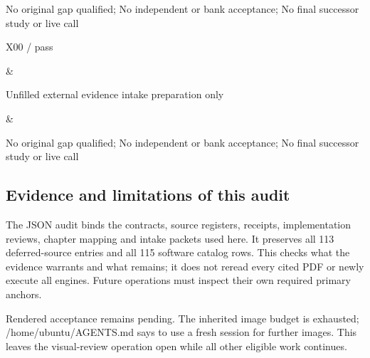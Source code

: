 \documentclass[
  10pt,
]{article}
\begin{document}
\begin{longtable}[]
\begin{minipage}[t]{\linewidth}
No original gap qualified; No independent or bank acceptance; No final
successor study or live call\strut
\end{minipage}\tabularnewline
\begin{minipage}[t]{\linewidth}\raggedright
X00 / pass\strut
\end{minipage} & \begin{minipage}[t]{\linewidth}\raggedright
Unfilled external evidence intake preparation only\strut
\end{minipage} & \begin{minipage}[t]{\linewidth}\raggedright
No original gap qualified; No independent or bank acceptance; No final
successor study or live call\strut
\end{minipage}\tabularnewline
\bottomrule
\end{longtable}

\hypertarget{evidence-and-limitations-of-this-audit}{%
\subsection{Evidence and limitations of this
audit}\label{evidence-and-limitations-of-this-audit}}

The JSON audit binds the contracts, source registers, receipts,
implementation reviews, chapter mapping and intake packets used here. It
preserves all 113 deferred-source entries and all 115 software catalog
rows. This checks what the evidence warrants and what remains; it does
not reread every cited PDF or newly execute all engines. Future
operations must inspect their own required primary anchors.

Rendered acceptance remains pending. The inherited image budget is
exhausted; /home/ubuntu/AGENTS.md says to use a fresh session for
further images. This leaves the visual-review operation open while all
other eligible work continues.
\end{document}
